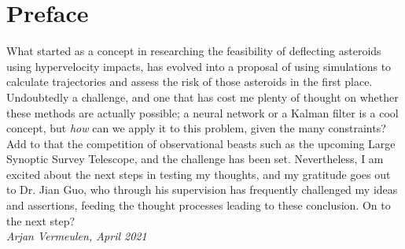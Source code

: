 \chapter{Preface}
\label{ch:preface}

What started as a concept in researching the feasibility of deflecting asteroids using hypervelocity impacts, has evolved into a proposal of using simulations to calculate trajectories and assess the risk of those asteroids in the first place. Undoubtedly a challenge, and one that has cost me plenty of thought on whether these methods are actually possible; a neural network or a Kalman filter is a cool concept, but \textit{how} can we apply it to this problem, given the many constraints? Add to that the competition of observational beasts such as the upcoming Large Synoptic Survey Telescope, and the challenge has been set. Nevertheless, I am excited about the next steps in testing my thoughts, and my gratitude goes out to Dr. Jian Guo, who through his supervision has frequently challenged my ideas and assertions, feeding the thought processes leading to these conclusion. On to the next step?\\

\textit{Arjan Vermeulen, April 2021}